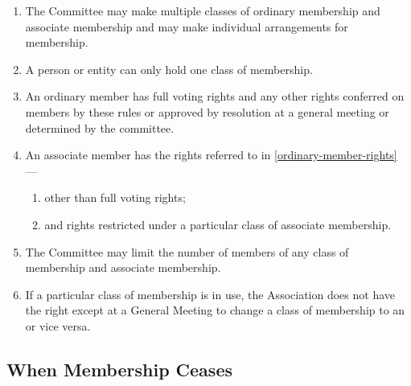 \documentclass[../constitution.tex]{subfiles}
\begin{document}
\begin{enumerate}
\item The Committee may make multiple classes of ordinary membership and associate membership and may make individual arrangements for membership. 
\item A person or entity  can only hold one class of membership.
\item An ordinary member has full voting rights and any other rights conferred on members by these rules or approved by resolution at a general meeting or determined by the committee. \label{ordinary-member-rights}
\item An associate member has the rights referred to in  \ref{ordinary-member-rights} --- \label{associate-member-rights}
  \begin{enumerate}
  \item other than full voting rights;
  \item and rights restricted under a particular class of associate membership.
  \end{enumerate}
\item The Committee may limit the number of members of any class of membership and associate membership.
\item If a particular class of membership is in use, the Association does not have the right except at a General Meeting to change a class of  membership to an  or vice versa.
\end{enumerate}


\subsection{When Membership Ceases} \label{when-membership-ceases}
\end{document}
